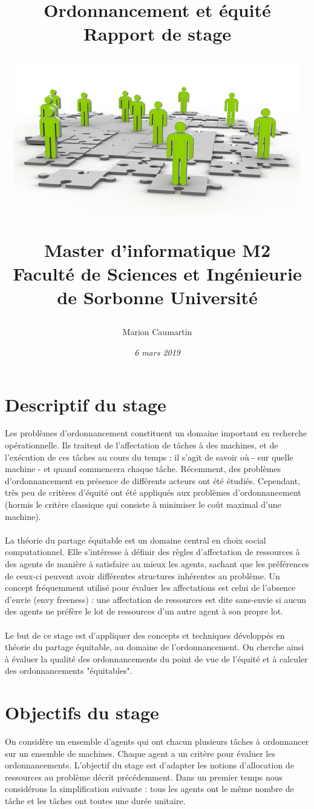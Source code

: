 \documentclass[12pt]{article}
\title{\vspace{20mm}
        \LARGE \textbf {Ordonnancement et équité}\\
        \vspace{8mm}
        \large \textbf{Rapport de stage}\\
        \vspace{10mm}
        \begin{center}
            \includegraphics[scale = 1]{main_title.jpg}
        \end{center}
        \author{Marion Caumartin}
        \large {Master d'informatique M2}\\
          \vspace{5mm}
        \large {Faculté de Sciences et Ingénieurie de Sorbonne Université \vspace{15mm}}\\ 
        \date{\vspace{10mm} \textsf{\textrm{\textit{6 mars 2019}}}}}
\theoremstyle{definition}
\begin{document}
\maketitle
\thispagestyle{empty}

\newpage

\tableofcontents
\thispagestyle{empty}

\newpage
\setcounter{page}{1}
\section{Descriptif du stage}
\noindent
Les problèmes d'ordonnancement constituent un domaine important en recherche opérationnelle. Ils traitent de l'affectation de tâches à des machines, et de l'exécution de ces tâches au cours du temps : il s'agit de savoir où - sur quelle machine - et quand commencera chaque tâche. Récemment, des problèmes d'ordonnancement en présence de différents acteurs ont été étudiés. Cependant, très peu de critères d'équité ont été appliqués aux problèmes d'ordonnancement (hormis le critère classique qui consiste à minimiser le coût maximal d'une machine).\\\\
La théorie du partage équitable est un domaine central en choix social computationnel. Elle s'intéresse à définir des règles d'affectation de ressources à des agents de manière à satisfaire au mieux les agents, sachant que les préférences de ceux-ci peuvent avoir différentes structures inhérentes au problème. Un concept fréquemment utilisé pour évaluer les affectations est celui de l'absence d'envie (envy freeness) : une affectation de ressources est dite sans-envie si aucun des agents ne préfère le lot de ressources d'un autre agent à son propre lot.\\\\
Le but de ce stage est d'appliquer des concepts et techniques développés en théorie du partage équitable, au domaine de l'ordonnancement. On cherche ainsi à évaluer la qualité des ordonnancements du point de vue de l'équité et à calculer des ordonnancements "équitables".

\section{Objectifs du stage}
\noindent
On considère un ensemble d'agents qui ont chacun plusieurs tâches à ordonnancer sur un ensemble de machines. Chaque agent a un critère pour évaluer les ordonnancements. L'objectif du stage est d'adapter les notions d'allocation de ressources au problème décrit précédemment. Dans un premier temps nous considérons la simplification suivante : tous les agents ont le même nombre de tâche et les tâches ont toutes une durée unitaire.
\end{document}
